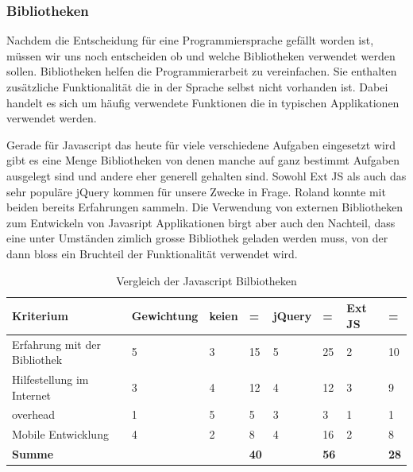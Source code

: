 \documentclass[11pt,paper=a4,final]{scrartcl}
\begin{document}
\subsubsection{Bibliotheken}
Nachdem die Entscheidung f\"ur eine Programmiersprache gef\"allt worden ist,
m\"ussen wir uns noch entscheiden ob und welche Bibliotheken verwendet werden
sollen. Bibliotheken helfen die Programmierarbeit zu vereinfachen. Sie enthalten
zus\"atzliche Funktionalit\"at die in der Sprache selbst nicht vorhanden ist.
Dabei handelt es sich um h\"aufig verwendete Funktionen die in typischen
Applikationen verwendet werden.

Gerade f\"ur Javascript das heute f\"ur viele verschiedene Aufgaben eingesetzt
wird gibt es eine Menge Bibliotheken von denen manche auf ganz bestimmt Aufgaben
ausgelegt sind und andere eher generell gehalten sind. Sowohl Ext JS als auch
das sehr popul\"are jQuery kommen f\"ur unsere Zwecke in Frage. Roland konnte
mit beiden bereits Erfahrungen sammeln. Die Verwendung von externen Bibliotheken
zum Entwickeln von Javasript Applikationen birgt aber auch den Nachteil, dass
eine unter Umst\"anden zimlich grosse Bibliothek geladen werden muss, von der
dann bloss ein Bruchteil der Funktionalit\"at verwendet wird.
\begin{table}[h!]
  \centering
  \begin{tabular}{|p{5cm}|l|l|l|l|l|l|l|} \hline
    \bf Kriterium & \bf Gewichtung & \bf keien & \bf = & \bf jQuery &
    \bf = & \bf Ext JS & \bf = \\ \hline
      Erfahrung mit der Bibliothek & 5 & 3 & 15 & 5 & 25 & 2 & 10 \\ \hline
      Hilfestellung im Internet    & 3 & 4 & 12 & 4 & 12 & 3 & 9  \\ \hline
      overhead                     & 1 & 5 & 5  & 3 & 3  & 1 & 1  \\ \hline
      Mobile Entwicklung	   & 4 & 2 & 8  & 4 & 16 & 2 & 8  \\ \hline
      \bf Summe			   &   &   & \cellcolor{red!80!} \bf 40 &   &
      \cellcolor{green!80!} \bf 56 &   & \cellcolor{red!80!} \bf 28 \\ \hline
  \end{tabular}
  \caption{Vergleich der Javascript Bilbiotheken}
  \label{tab:libraries}
\end{table}
\end{document}
